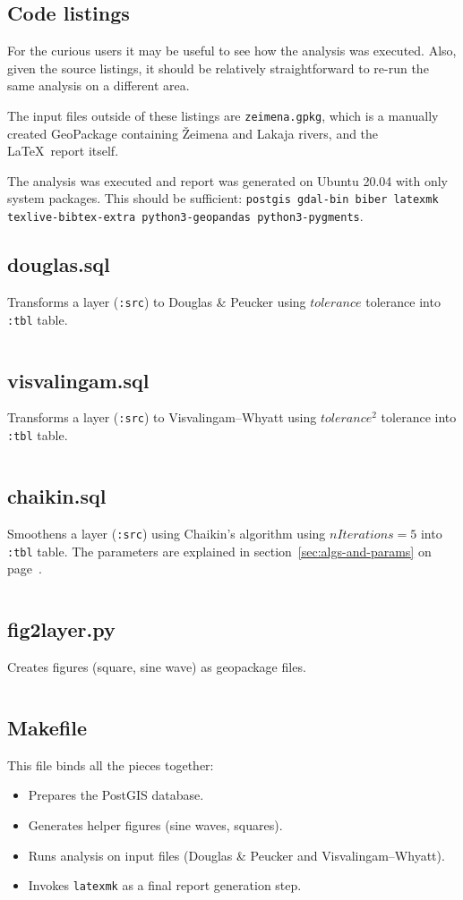 \documentclass[a4paper]{article}
\newcommand{\DP}{Douglas \& Peucker}
\newcommand{\VW}{Visvalingam--Whyatt}
\begin{document}
\begin{appendices}
\section{Code listings}

For the curious users it may be useful to see how the analysis was executed.
Also, given the source listings, it should be relatively straightforward to
re-run the same analysis on a different area.

The input files outside of these listings are {\tt zeimena.gpkg}, which is a
manually created GeoPackage containing Žeimena and Lakaja rivers, and the
\LaTeX\ report itself.

The analysis was executed and report was generated on Ubuntu 20.04 with only
system packages. This should be sufficient: {\tt postgis gdal-bin biber
latexmk texlive-bibtex-extra python3-geopandas python3-pygments}.

\subsection{douglas.sql}
Transforms a layer ({\tt :src}) to {\DP} using $tolerance$ tolerance into
{\tt :tbl} table.
\inputminted[fontsize=\small]{sql}{douglas.sql}

\subsection{visvalingam.sql}
Transforms a layer ({\tt :src}) to {\VW} using $tolerance^2$ tolerance into
{\tt :tbl} table.
\inputminted[fontsize=\small]{sql}{visvalingam.sql}

\subsection{chaikin.sql}
Smoothens a layer ({\tt :src}) using Chaikin's algorithm using $nIterations =
    5$ into {\tt :tbl} table. The parameters are explained in
    section~\ref{sec:algs-and-params} on page~\pageref{sec:algs-and-params}.

\inputminted[fontsize=\small]{sql}{chaikin.sql}

\subsection{fig2layer.py}
Creates figures (square, sine wave) as geopackage files.
\inputminted[fontsize=\small]{python}{fig2layer.py}

\subsection{Makefile}
This file binds all the pieces together:
\begin{itemize}
    \item Prepares the PostGIS database.
    \item Generates helper figures (sine waves, squares).
    \item Runs analysis on input files ({\DP} and {\VW}).
    \item Invokes {\tt latexmk} as a final report generation step.
\end{itemize}
\inputminted[fontsize=\small]{make}{Makefile}


\end{appendices}
\end{document}

